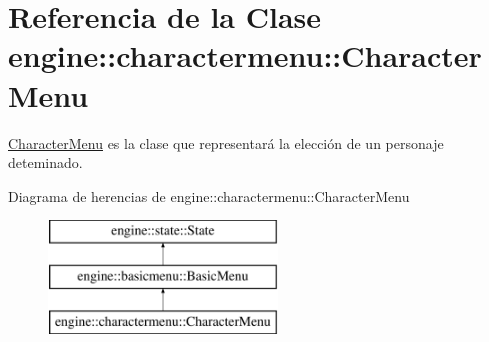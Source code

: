 \hypertarget{classengine_1_1charactermenu_1_1CharacterMenu}{
\section{\-Referencia de la \-Clase engine\-:\-:charactermenu\-:\-:\-Character\-Menu}
\label{classengine_1_1charactermenu_1_1CharacterMenu}
}


\hyperlink{classengine_1_1charactermenu_1_1CharacterMenu}{\-Character\-Menu} es la clase que representará la elección de un personaje deteminado.  


\-Diagrama de herencias de engine\-:\-:charactermenu\-:\-:\-Character\-Menu\begin{figure}[H]
\begin{center}
\leavevmode
\includegraphics[height=3.000000cm]{classengine_1_1charactermenu_1_1CharacterMenu}
\end{center}
\end{figure}
